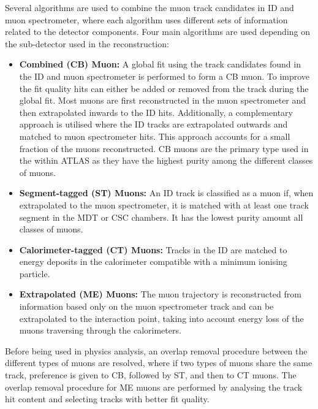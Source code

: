 Several algorithms are used to combine the muon track candidates in ID and muon spectrometer, where each algorithm uses different sets of information related to the detector components. Four main algorithms are used depending on the sub-detector used in the reconstruction:
\begin{itemize}
    \item \textbf{Combined (CB) Muon:} A global fit using the track candidates found in the ID and muon spectrometer is performed to form a CB muon. To improve the fit quality hits can either be added or removed from the track during the global fit. Most muons are first reconstructed in the muon spectrometer and then extrapolated inwards to the ID hits. Additionally, a complementary approach is utilised where the ID tracks are extrapolated outwards and matched to muon spectrometer hits. This approach accounts for a small fraction of the muons reconstructed. CB muons are the primary type used in the within ATLAS as they have the highest purity among the different classes of muons.
    \item \textbf{Segment-tagged (ST) Muons:}  An ID track is classified as a muon if, when extrapolated to the muon spectrometer, it is matched with at least one track segment in the MDT or CSC chambers. It has the lowest purity amount all classes of muons.
    \item \textbf{Calorimeter-tagged (CT) Muons:} Tracks in the ID are matched to energy deposits in the calorimeter compatible with a minimum ionising particle. 
    \item \textbf{Extrapolated (ME) Muons:} The muon trajectory is reconstructed from information based only on the muon spectrometer track and can be extrapolated to the interaction point, taking into account energy loss of the muons traversing through the calorimeters. 
\end{itemize}

Before being used in physics analysis, an overlap removal procedure between the different types of muons are resolved, where if two types of muons share the same track, preference is given to CB, followed by ST, and then to CT muons. The overlap removal procedure for ME muons are performed by analysing the track hit content and selecting tracks with better fit quality. 

